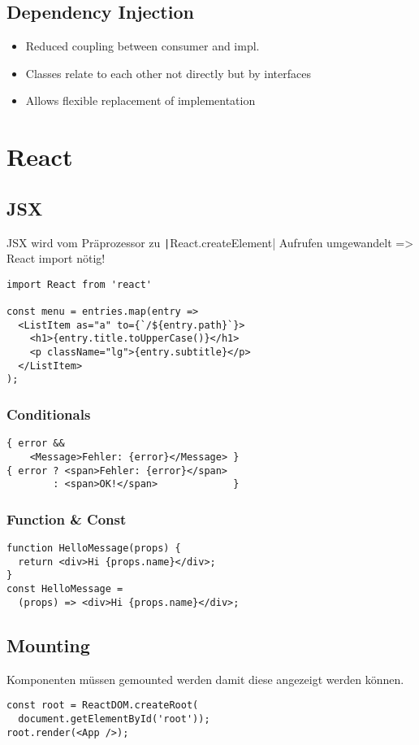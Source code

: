 \begin{multicols*}{4}
\subsection{Dependency Injection}
\begin{itemize}
    \item Reduced coupling between consumer and impl.
    \item Classes relate to each other not directly but by interfaces
    \item Allows flexible replacement of implementation
\end{itemize}

\section{React}

\subsection{JSX}
JSX wird vom Präprozessor zu \texttt|React.createElement| Aufrufen umgewandelt => React import nötig!
\begin{verbatim}
import React from 'react'

const menu = entries.map(entry =>
  <ListItem as="a" to={`/${entry.path}`}>
    <h1>{entry.title.toUpperCase()}</h1>
    <p className="lg">{entry.subtitle}</p>
  </ListItem>
);
\end{verbatim}

\subsubsection{Conditionals}
\begin{verbatim}
{ error &&
    <Message>Fehler: {error}</Message> }
{ error ? <span>Fehler: {error}</span>
        : <span>OK!</span>             }
\end{verbatim}

\subsubsection{Function \& Const}
\begin{verbatim}
function HelloMessage(props) {
  return <div>Hi {props.name}</div>;
}
const HelloMessage =
  (props) => <div>Hi {props.name}</div>;
\end{verbatim}

\subsection{Mounting}
Komponenten müssen gemounted werden damit diese angezeigt werden können.
\begin{verbatim}
const root = ReactDOM.createRoot(
  document.getElementById('root'));
root.render(<App />);
\end{verbatim}


\end{multicols*}
